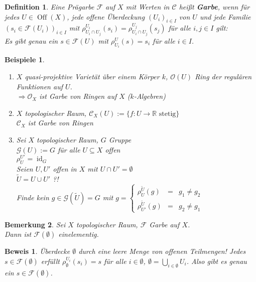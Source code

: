 \documentclass[paper = A4, fontsize=12pt, numbers=noendperiod, chapterprefix=true]{scrbook}
\theoremstyle{break}
\newtheorem{Def}{Definition}[section]
\newtheorem{Bem}[Def]{Bemerkung}
\theoremstyle{nonumberbreak}
\newtheorem{bspe}{Beispiele}
\newtheorem{bew}{Beweis}
\theoremstyle{nonumberplain}
\newcommand{\emp}[1]{\textbf{\emph{#1}}}
\newcommand{\defterm}[1]{{\index{#1}}\emp{#1}}
\DeclareMathOperator{\Off}{Off}
\DeclareMathOperator{\id}{id}
\newcommand{\R}{\mathbb{R}}
\begin{document}
\begin{Def}\label{1.3}
Eine Pr\"agarbe $\mathcal F$ auf $X$ mit Werten in $\mathcal C$ hei\ss t \defterm{Garbe}, wenn f\"ur jedes $U\in \Off(X)$, jede offene \"Uberdeckung $(U_i)_{i\in I}$ von $U$ und jede Familie $(s_i \in \mathcal F(U_i))_{i \in I}$ mit $\rho_{U_i\cap U_j}^{U_i}(s_i) = \rho_{U_i\cap U_j}^{U_j}(s_j)$ f\"ur alle $i,j \in I$ gilt:\\
Es gibt \emph{genau ein} $s \in \mathcal F(U)$ mit $\rho_{U_i}^U(s) = s_i$ f\"ur alle $i \in I$.
\end{Def}

\begin{bspe}\label{bsp1.3}\begin{enumerate}[1)]
\item
  $X$ quasi-projektive Variet\"at \"uber einem K\"orper $k$, $\mathcal O(U)$ Ring der regul\"aren Funktionen auf $U$.\\
  $\Rightarrow \mathcal O_X$ ist Garbe von Ringen auf $X$ ($k$-Algebren)
\item
  $X$ topologischer Raum, $\mathcal C_X(U) := \{f: U\to \R \text{ stetig}\}$\\
  $\mathcal C_X$ ist Garbe von Ringen
\item\label{bsp1.3.3}
  Sei $X$ topologischer Raum, $G$ Gruppe\\
  $\mathcal G(U) := G$ f\"ur alle $U \subseteq X$ offen\\
  $\rho_U^{U'} = \id_G$\\
  Seien $U, U'$ offen in $X$ mit $U\cap U' = \emptyset$\\
  $\widetilde U = U \cup U'$ ?!\\
  Finde kein $g\in \mathcal G(\widetilde U) = G$ mit $g = \left\{\begin{array}{rcl} \rho_{U}^{\widetilde U}(g) &=& g_1 \ne g_2 \\ \rho_{U'}^{\widetilde U}(g) &=& g_2 \ne g_1 \end{array}\right.$
\end{enumerate}\end{bspe}

\begin{Bem}
Sei $X$ topologischer Raum, $\mathcal F$ Garbe auf $X$.\\
Dann ist $\mathcal F(\emptyset)$ einelementig.
\end{Bem}

\begin{bew}
\"Uberdecke $\emptyset$ durch eine leere Menge von offenen Teilmengen! Jedes $s\in\mathcal F(\emptyset)$ erf\"ullt $\rho_{\emptyset}^{U_i}(s_i) = s$ f\"ur alle $i\in \emptyset$, $\emptyset = \bigcup\limits_{i\in \emptyset} U_i$. Also gibt es genau ein $s  \in\mathcal F(\emptyset)$.
\end{bew}
\end{document}
